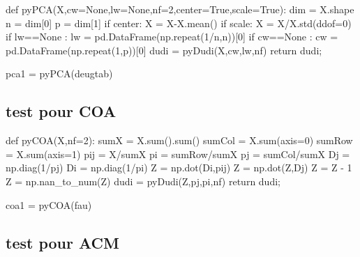 \documentclass[
  10pt,
]{article}
\newenvironment{Shaded}{\begin{snugshade}}{\end{snugshade}}
\newcommand{\NormalTok}[1]{#1}
\begin{document}
\begin{Shaded}
\begin{Highlighting}[]
\NormalTok{def pyPCA(X,cw=None,lw=None,nf=2,center=True,scale=True):}
\NormalTok{  dim = X.shape}
\NormalTok{  n = dim[0]}
\NormalTok{  p = dim[1]  }
\NormalTok{  if center:}
\NormalTok{    X = X{-}X.mean()}
\NormalTok{  if scale:}
\NormalTok{    X = X/X.std(ddof=0)}
\NormalTok{  if lw==None :}
\NormalTok{    lw = pd.DataFrame(np.repeat(1/n,n))[0]}
\NormalTok{  if cw==None :}
\NormalTok{    cw = pd.DataFrame(np.repeat(1,p))[0]}
\NormalTok{  dudi = pyDudi(X,cw,lw,nf)  }
\NormalTok{  return dudi;}
\end{Highlighting}
\end{Shaded}

\begin{Shaded}
\begin{Highlighting}[]
\NormalTok{pca1 = pyPCA(deugtab)}
\end{Highlighting}
\end{Shaded}

\subsection{test pour COA}\label{test-pour-coa}

\begin{Shaded}
\begin{Highlighting}[]
\NormalTok{def pyCOA(X,nf=2):}
\NormalTok{  sumX = X.sum().sum()}
\NormalTok{  sumCol =  X.sum(axis=0)}
\NormalTok{  sumRow = X.sum(axis=1)}
\NormalTok{  pij = X/sumX}
\NormalTok{  pi = sumRow/sumX}
\NormalTok{  pj = sumCol/sumX}
\NormalTok{  Dj = np.diag(1/pj)}
\NormalTok{  Di = np.diag(1/pi)}
\NormalTok{  Z = np.dot(Di,pij)}
\NormalTok{  Z = np.dot(Z,Dj)}
\NormalTok{  Z = Z {-} 1}
\NormalTok{  Z = np.nan\_to\_num(Z)}
\NormalTok{  dudi = pyDudi(Z,pj,pi,nf)  }
\NormalTok{  return dudi;}
\end{Highlighting}
\end{Shaded}

\begin{Shaded}
\begin{Highlighting}[]
\NormalTok{coa1 = pyCOA(fau)}
\end{Highlighting}
\end{Shaded}

\subsection{test pour ACM}\label{test-pour-acm}
\end{document}
